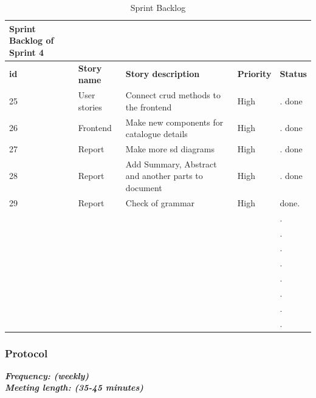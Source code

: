\documentclass{scrartcl}
\begin{document}
          \begin{table}[H]
\begin{center}
\begin{tabular}{| p{2.5cm}| p{4cm} | p{5cm} |p{2.5cm} | p{4cm}|}
   Sprint Backlog of Sprint 4\\ \hline
    

          \textbf{id}  &  \textbf{Story name} &  \textbf{Story description} &  \textbf{Priority}  & \textbf{Status}\\ \hline
	
	 25  & User stories & Connect crud methods to the frontend & High & . done\\ \hline
	  26  & Frontend & Make new components for catalogue details  & High & . done\\ \hline
	    27 & Report & Make more sd diagrams & High & . done\\ \hline
	     28  & Report  & Add Summary, Abstract and another parts to document & High & . done\\ \hline
	    29   & Report & Check of grammar  & High & done. \\ \hline
	        &  &  &  & . \\ \hline
	         &  &  &  & . \\ \hline
	         &  &  &  & . \\ \hline
	           &  &  &  & . \\ \hline
	            &  &  &  & . \\ \hline
	             &  &  &  & . \\ \hline
	              &  &  &  & . \\ \hline
	               &  &  &  & . \\ \hline
	
	 
        
    \end{tabular}
    \end{center}
    \caption{Sprint Backlog}
    \label{tab:typo}
\end{table}

   

   
    
   
  

\subsubsection{Protocol}
\textbf{\textit{Frequency: (weekly) \\
Meeting length: (35-45 minutes)}}\\
\end{document}
